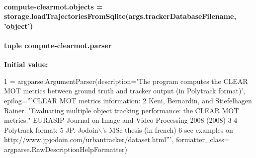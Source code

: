 \hypertarget{namespacecompute-clearmot_a4ebfb33f7f61805c131e08b6c021827d}{
\paragraph[{objects}]{\setlength{\rightskip}{0pt plus 5cm}compute-\/clearmot.\-objects = {\bf storage.\-load\-Trajectories\-From\-Sqlite}(args.\-tracker\-Database\-Filename, 'object')}}\label{namespacecompute-clearmot_a4ebfb33f7f61805c131e08b6c021827d}
\hypertarget{namespacecompute-clearmot_ad3bd2e52122d02473330a4fbe63b978a}{
\paragraph[{parser}]{\setlength{\rightskip}{0pt plus 5cm}tuple compute-\/clearmot.\-parser}}\label{namespacecompute-clearmot_ad3bd2e52122d02473330a4fbe63b978a}
{\bfseries Initial value\-:}
\begin{DoxyCode}
1 = argparse.ArgumentParser(description=\textcolor{stringliteral}{'The program computes the CLEAR MOT metrics between ground truth and
       tracker output (in Polytrack format)'}, epilog=\textcolor{stringliteral}{'''CLEAR MOT metrics information:}
2 \textcolor{stringliteral}{Keni, Bernardin, and Stiefelhagen Rainer. "Evaluating multiple object tracking performance: the CLEAR MOT
       metrics." EURASIP Journal on Image and Video Processing 2008 (2008)}
3 \textcolor{stringliteral}{}
4 \textcolor{stringliteral}{Polytrack format: }
5 \textcolor{stringliteral}{JP. Jodoin\(\backslash\)'s MSc thesis (in french)}
6 \textcolor{stringliteral}{see examples on http://www.jpjodoin.com/urbantracker/dataset.html'''}, formatter\_class=
      argparse.RawDescriptionHelpFormatter)
\end{DoxyCode}
